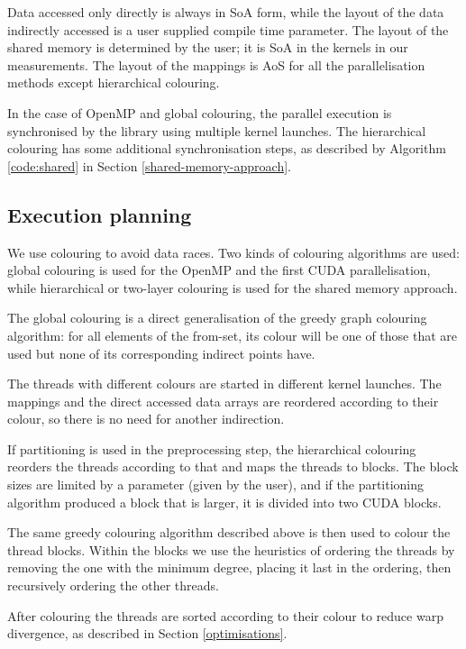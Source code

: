 Data accessed only directly is always in SoA form, while the layout of the
data indirectly accessed is a user supplied compile time parameter. The layout
of the shared memory is determined by the user; it is SoA in the kernels in our
measurements. The layout of the mappings is AoS for all the parallelisation
methods except hierarchical colouring.

In the case of OpenMP and global colouring, the parallel execution is
synchronised by the library using multiple kernel launches. The hierarchical
colouring has some additional synchronisation steps, as described by Algorithm
\ref{code:shared} in Section \ref{shared-memory-approach}.

\subsection{Execution planning}

We use colouring to avoid data races. Two kinds of colouring algorithms are
used: global colouring is used for the OpenMP and the first CUDA
parallelisation, while hierarchical or two-layer colouring is used for the
shared memory approach.

The global colouring is a direct generalisation of the greedy graph colouring
algorithm: for all elements of the from-set, its colour will be one of those
that are used but none of its corresponding indirect points have.

The threads with different colours are started in different kernel launches. The
mappings and the direct accessed data arrays are reordered according to their
colour, so there is no need for another indirection.

If partitioning is used in the preprocessing step, the hierarchical colouring
reorders the threads according to that and maps the threads to blocks. The block
sizes are limited by a parameter (given by the user), and if the partitioning
algorithm produced a block that is larger, it is divided into two CUDA blocks.

The same greedy colouring algorithm described above is then used to colour the
thread blocks. Within the blocks we use the heuristics of ordering the threads
by removing the one with the minimum degree, placing it last in the ordering,
then recursively ordering the other threads.

After colouring the threads are sorted according to their colour to reduce warp
divergence, as described in Section \ref{optimisations}.

